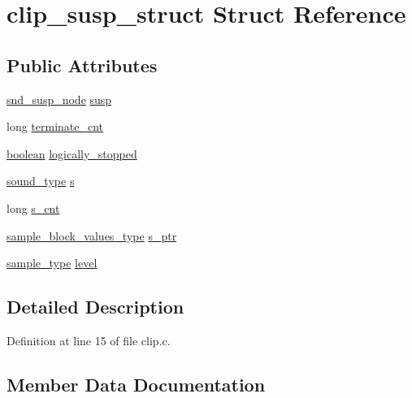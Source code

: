 \hypertarget{structclip__susp__struct}{}\section{clip\+\_\+susp\+\_\+struct Struct Reference}
\label{structclip__susp__struct}
\subsection*{Public Attributes}
\begin{DoxyCompactItemize}
\item 
\hyperlink{sound_8h_a6b268203688a934bd798ceb55f85d4c0}{snd\+\_\+susp\+\_\+node} \hyperlink{structclip__susp__struct_ac61438cb89b1baa39a55dc5a073a8d5a}{susp}
\item 
long \hyperlink{structclip__susp__struct_a0019def1ed0bf8d21ea246fbe70c1c20}{terminate\+\_\+cnt}
\item 
\hyperlink{cext_8h_a7670a4e8a07d9ebb00411948b0bbf86d}{boolean} \hyperlink{structclip__susp__struct_a777100ae2b579b310ceba48ac325c9b3}{logically\+\_\+stopped}
\item 
\hyperlink{sound_8h_a792cec4ed9d6d636d342d9365ba265ea}{sound\+\_\+type} \hyperlink{structclip__susp__struct_ac52e61d1e14914a137b1501b59e2c3a1}{s}
\item 
long \hyperlink{structclip__susp__struct_a03da60faf284bca6b86928b07d4bee36}{s\+\_\+cnt}
\item 
\hyperlink{sound_8h_a83d17f7b465d1591f27cd28fc5eb8a03}{sample\+\_\+block\+\_\+values\+\_\+type} \hyperlink{structclip__susp__struct_af31a6c0f02edefcb7f83f70382f36468}{s\+\_\+ptr}
\item 
\hyperlink{sound_8h_a3a9d1d4a1c153390d2401a6e9f71b32c}{sample\+\_\+type} \hyperlink{structclip__susp__struct_a6f145bb99356d76153f792440a3794c3}{level}
\end{DoxyCompactItemize}


\subsection{Detailed Description}


Definition at line 15 of file clip.\+c.



\subsection{Member Data Documentation}
